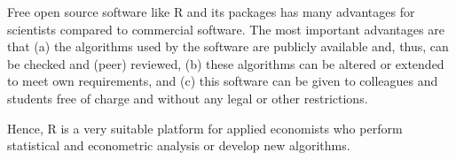 \documentclass[12pt,english]{article}
\begin{document}
Free open source software like R and its packages has many advantages 
for scientists compared to commercial software.
The most important advantages are that
(a) the algorithms used by the software are publicly available and, thus,
can be checked and (peer) reviewed,
(b) these algorithms can be altered or extended to meet own requirements, and
(c) this software can be given to colleagues and students free of charge and
without any legal or other restrictions.

Hence, R is a very suitable platform for applied economists who perform
statistical and econometric analysis or develop new algorithms.


%

\end{document}
